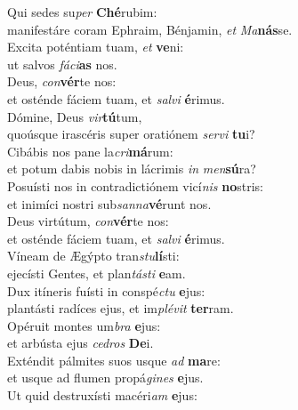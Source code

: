 \evenverse Qui sedes su\textit{per} \textbf{Ché}rubim:~\*\\
\evenverse manifestáre coram Ephraim, Bénjamin, \textit{et} \textit{Ma}\textbf{nás}se.\\
\oddverse Excita poténtiam tuam, \textit{et} \textbf{ve}ni:~\*\\
\oddverse ut salvos \textit{fá}\textit{ci}\textbf{as} nos.\\
\evenverse Deus, \textit{con}\textbf{vér}te nos:~\*\\
\evenverse et osténde fáciem tuam, et \textit{sal}\textit{vi} \textbf{é}rimus.\\
\oddverse Dómine, Deus \textit{vir}\textbf{tú}tum,~\*\\
\oddverse quoúsque irascéris super oratiónem \textit{ser}\textit{vi} \textbf{tu}i?\\
\evenverse Cibábis nos pane la\textit{cri}\textbf{má}rum:~\*\\
\evenverse et potum dabis nobis in lácrimis \textit{in} \textit{men}\textbf{sú}ra?\\
\oddverse Posuísti nos in contradictiónem vicí\textit{nis} \textbf{no}stris:~\*\\
\oddverse et inimíci nostri sub\textit{san}\textit{na}\textbf{vé}runt nos.\\
\evenverse Deus virtútum, \textit{con}\textbf{vér}te nos:~\*\\
\evenverse et osténde fáciem tuam, et \textit{sal}\textit{vi} \textbf{é}rimus.\\
\oddverse Víneam de Ægýpto tran\textit{stu}\textbf{lí}sti:~\*\\
\oddverse ejecísti Gentes, et plan\textit{tá}\textit{sti} \textbf{e}am.\\
\evenverse Dux itíneris fuísti in conspé\textit{ctu} \textbf{e}jus:~\*\\
\evenverse plantásti radíces ejus, et im\textit{plé}\textit{vit} \textbf{ter}ram.\\
\oddverse Opéruit montes um\textit{bra} \textbf{e}jus:~\*\\
\oddverse et arbústa ejus \textit{ce}\textit{dros} \textbf{De}i.\\
\evenverse Exténdit pálmites suos usque \textit{ad} \textbf{ma}re:~\*\\
\evenverse et usque ad flumen propá\textit{gi}\textit{nes} \textbf{e}jus.\\
\oddverse Ut quid destruxísti macéri\textit{am} \textbf{e}jus:~\*\\
